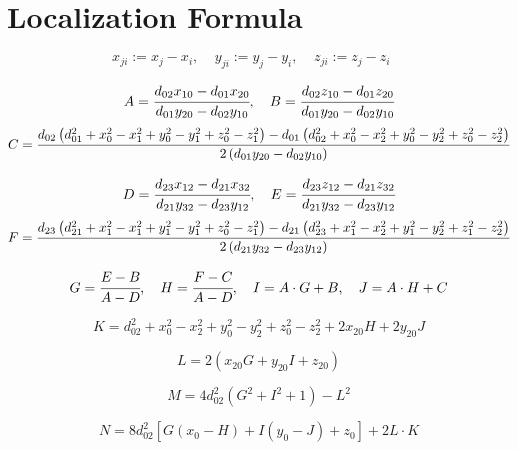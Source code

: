\chapter{Localization Formula}

\begin{equation}
	x_{ji}:=x_j-x_i,~~~~~
	y_{ji}:=y_j-y_i,~~~~~
	z_{ji}:=z_j-z_i~~~~~
\end{equation}

\begin{equation}
	{A}=\cfrac{d_{02}x_{10}-d_{01}x_{20}}{d_{01}y_{20}-d_{02}y_{10}},~~~
	{B}=\cfrac{d_{02}z_{10}-d_{01}z_{20}}{d_{01}y_{20}-d_{02}y_{10}}
\end{equation}	
\begin{equation}
	{C}=\cfrac{d_{02}\left(d_{01}^2+x_0^2-x_1^2+y_0^2-y_1^2+z_0^2-z_1^2\right)-d_{01}\left(d_{02}^2+x_0^2-x_2^2+y_0^2-y_2^2+z_0^2-z_2^2\right)}{2\left(d_{01}y_{20}-d_{02}y_{10}\right)}
\end{equation}	

\begin{equation}
	{D}=\cfrac{d_{23}x_{12}-d_{21}x_{32}}{d_{21}y_{32}-d_{23}y_{12}},~~~
	{E}=\cfrac{d_{23}z_{12}-d_{21}z_{32}}{d_{21}y_{32}-d_{23}y_{12}}
\end{equation}	
\begin{equation}
	{F}=\cfrac{d_{23}\left(d_{21}^2+x_1^2-x_1^2+y_1^2-y_1^2+z_0^2-z_1^2\right)-d_{21}\left(d_{23}^2+x_1^2-x_2^2+y_1^2-y_2^2+z_1^2-z_2^2\right)}{2\left(d_{21}y_{32}-d_{23}y_{12}\right)}
\end{equation}	

\begin{equation}
	{G}=\cfrac{{E}-{B}}{{A}-{D}},~~~
	{H}=\cfrac{{F}-{C}}{{A}-{D}},~~~
	{I}={A}\cdot {G}+{B},~~~
	{J}={A}\cdot {H}+{C}
\end{equation}	

\begin{equation}
	{K}=d_{02}^2+x_0^2-x_2^2+y_0^2-y_2^2+z_0^2-z_2^2+2x_{20}{H}+2y_{20}{J}
\end{equation}	

\begin{equation}
	{L}=2\left(x_{20}{G}+y_{20}{I}+z_{20}\right)
\end{equation}	

\begin{equation}
	{M}=4d_{02}^2\left({G}^2+{I}^2+1\right)-{L}^2
\end{equation}	

\begin{equation}
	{N}=8d_{02}^2\left[{G}\left(x_0-{H}\right)+{I}\left(y_0-{J}\right)+z_0\right]+2{L}\cdot{K}
\end{equation}	

